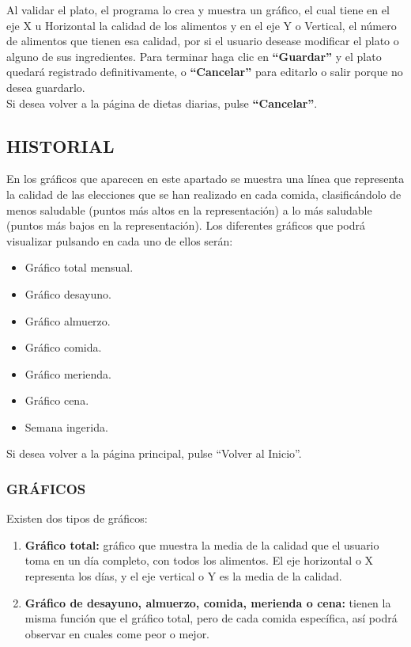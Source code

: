 Al validar el plato, el programa lo crea y muestra un gráfico, el cual tiene en el eje X u Horizontal la calidad de los alimentos y en el eje Y o Vertical, el número de alimentos que tienen esa calidad, por si el usuario desease modificar el plato o alguno de sus ingredientes. Para terminar haga clic en \textbf{“Guardar”} y el plato quedará registrado definitivamente, o \textbf{“Cancelar”} para editarlo o salir porque no desea guardarlo.\\

Si desea volver a la página de dietas diarias, pulse \textbf{“Cancelar”}.

\subsection{HISTORIAL}

En los gráficos que aparecen en este apartado se muestra una línea que representa la calidad de las elecciones que se han realizado en cada comida, clasificándolo de menos saludable (puntos más altos en la representación) a lo más saludable (puntos más bajos en la representación).
Los diferentes gráficos que podrá visualizar pulsando en cada uno de ellos serán:
\begin{itemize}
\item	Gráfico total mensual.
\item	Gráfico desayuno.
\item	Gráfico almuerzo.
\item	Gráfico comida.
\item	Gráfico merienda.
\item	Gráfico cena.
\item	Semana ingerida.
\end{itemize}	

Si desea volver a la página principal, pulse “Volver al Inicio”.
\subsubsection{GRÁFICOS}
Existen dos tipos de gráficos:
\begin{enumerate}
\item \textbf{Gráfico total:} gráfico que muestra la media de la calidad que el usuario toma en un día completo, con todos los alimentos. El eje horizontal o X representa los días, y el eje vertical o Y es la media de la calidad.
\item \textbf{Gráfico de desayuno, almuerzo, comida, merienda o cena:} tienen la misma función que el gráfico total, pero de cada comida específica, así podrá observar en cuales come peor o mejor.
\end{enumerate}

